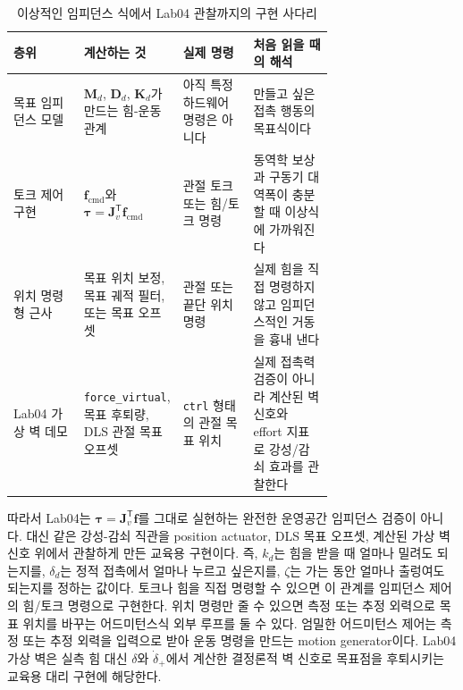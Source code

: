 \begin{table}[!htbp]
  \centering
  \caption{이상적인 임피던스 식에서 Lab04 관찰까지의 구현 사다리}
  \label{tab:impedance-implementation-ladder}
  \small
  \setlength{\tabcolsep}{4pt}
  \begin{tabularx}{\linewidth}{@{}>{\raggedright\arraybackslash}p{0.22\linewidth}>{\raggedright\arraybackslash}p{0.27\linewidth}>{\raggedright\arraybackslash}p{0.22\linewidth}>{\raggedright\arraybackslash}X@{}}
    \toprule
    층위 & 계산하는 것 & 실제 명령 & 처음 읽을 때의 해석 \\
    \midrule
    목표 임피던스 모델 & $\bm{M}_d$, $\bm{D}_d$, $\bm{K}_d$가 만드는 힘-운동 관계 & 아직 특정 하드웨어 명령은 아니다 & 만들고 싶은 접촉 행동의 목표식이다 \\
    토크 제어 구현 & $\bm{f}_{\mathrm{cmd}}$와 $\bm{\tau}=\bm{J}_v^{\mathsf{T}}\bm{f}_{\mathrm{cmd}}$ & 관절 토크 또는 힘/토크 명령 & 동역학 보상과 구동기 대역폭이 충분할 때 이상식에 가까워진다 \\
    위치 명령형 근사 & 목표 위치 보정, 목표 궤적 필터, 또는 목표 오프셋 & 관절 또는 끝단 위치 명령 & 실제 힘을 직접 명령하지 않고 임피던스적인 거동을 흉내 낸다 \\
    Lab04 가상 벽 데모 & \texttt{force\_virtual}, 목표 후퇴량, DLS 관절 목표 오프셋 & \texttt{ctrl} 형태의 관절 목표 위치 & 실제 접촉력 검증이 아니라 계산된 벽 신호와 effort 지표로 강성/감쇠 효과를 관찰한다 \\
    \bottomrule
  \end{tabularx}
\end{table}

따라서 Lab04는 $\bm{\tau}=\bm{J}_v^{\mathsf{T}}\bm{f}$를 그대로 실현하는 완전한 운영공간 임피던스 검증이 아니다.
%
대신 같은 강성-감쇠 직관을 position actuator, DLS 목표 오프셋, 계산된 가상 벽 신호 위에서 관찰하게 만든 교육용 구현이다.
즉, $k_d$는 힘을 받을 때 얼마나 밀려도 되는지를, $\delta_d$는 정적 접촉에서 얼마나 누르고 싶은지를, $\zeta$는 가는 동안 얼마나 출렁여도 되는지를 정하는 값이다.
토크나 힘을 직접 명령할 수 있으면 이 관계를 임피던스 제어의 힘/토크 명령으로 구현한다.
위치 명령만 줄 수 있으면 측정 또는 추정 외력으로 목표 위치를 바꾸는 어드미턴스식 외부 루프를 둘 수 있다.
엄밀한 어드미턴스 제어는 측정 또는 추정 외력을 입력으로 받아 운동 명령을 만드는 motion generator이다.
Lab04 가상 벽은 실측 힘 대신 $\delta$와 $\dot{\delta}_+$에서 계산한 결정론적 벽 신호로 목표점을 후퇴시키는 교육용 대리 구현에 해당한다.

